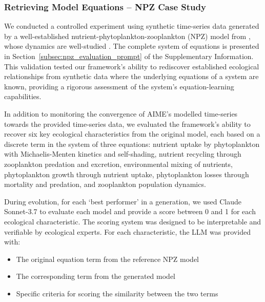 \subsubsection{Retrieving Model Equations -- NPZ Case Study}

We conducted a controlled experiment using synthetic time-series data generated by a well-established nutrient-phytoplankton-zooplankton (NPZ) model from \cite{edwards1999zooplankton}, whose dynamics are well-studied \citep{boschetti2008mapping,boschetti2010detecting}. The complete system of equations is presented in Section~\ref{subsec:npz_evaluation_prompt} of the Supplementary Information. This validation tested our framework's ability to rediscover established ecological relationships from synthetic data where the underlying equations of a system are known, providing a rigorous assessment of the system's equation-learning capabilities.

In addition to monitoring the convergence of AIME's modelled time-series towards the provided time-series data, we evaluated the framework's ability to recover six key ecological characteristics from the original model, each based on a discrete term in the system of three equations: nutrient uptake by phytoplankton with Michaelis-Menten kinetics and self-shading, nutrient recycling through zooplankton predation and excretion, environmental mixing of nutrients, phytoplankton growth through nutrient uptake, phytoplankton losses through mortality and predation, and zooplankton population dynamics.

During evolution, for each `best performer' in a generation, we used Claude Sonnet-3.7 to evaluate each model and provide a score between 0 and 1 for each ecological characteristic. The scoring system was designed to be interpretable and verifiable by ecological experts. For each characteristic, the LLM was provided with:
\begin{itemize}
    \item The original equation term from the reference NPZ model
    \item The corresponding term from the generated model
    \item Specific criteria for scoring the similarity between the two terms
\end{itemize}

